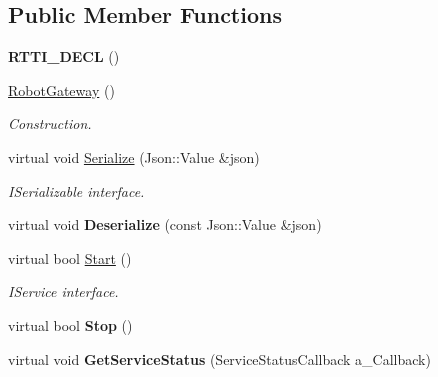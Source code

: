 \subsection*{Public Member Functions}
\begin{DoxyCompactItemize}
\item 
\mbox{\label{class_robot_gateway_ad92269ce84c4572cf85c048a9f659dd1}} 
{\bfseries R\+T\+T\+I\+\_\+\+D\+E\+CL} ()
\item 
\mbox{\label{class_robot_gateway_a28c0b116777769c06c0c56ac7a56cba2}} 
\hyperlink{class_robot_gateway_a28c0b116777769c06c0c56ac7a56cba2}{Robot\+Gateway} ()
\begin{DoxyCompactList}\small\item\em Construction. \end{DoxyCompactList}\item 
\mbox{\label{class_robot_gateway_a11101db43b15ea8a7514e99a98dc9e70}} 
virtual void \hyperlink{class_robot_gateway_a11101db43b15ea8a7514e99a98dc9e70}{Serialize} (Json\+::\+Value \&json)
\begin{DoxyCompactList}\small\item\em I\+Serializable interface. \end{DoxyCompactList}\item 
\mbox{\label{class_robot_gateway_a2bda02cfd986577641f700457374c598}} 
virtual void {\bfseries Deserialize} (const Json\+::\+Value \&json)
\item 
\mbox{\label{class_robot_gateway_abee150edb84fc1219bd16d5e1826e46f}} 
virtual bool \hyperlink{class_robot_gateway_abee150edb84fc1219bd16d5e1826e46f}{Start} ()
\begin{DoxyCompactList}\small\item\em I\+Service interface. \end{DoxyCompactList}\item 
\mbox{\label{class_robot_gateway_a37879ac91cf515d23170a365965b69c1}} 
virtual bool {\bfseries Stop} ()
\item 
\mbox{\label{class_robot_gateway_a59427dcfd7fa3e982b0ed26d3c93701d}} 
virtual void {\bfseries Get\+Service\+Status} (Service\+Status\+Callback a\+\_\+\+Callback)

\end{DoxyCompactItemize}
